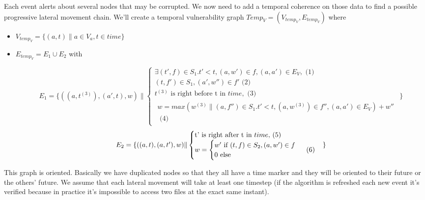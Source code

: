 \documentclass[11pt]{article}
\begin{document}
Each event alerts about several nodes that may be corrupted. We now need to add a temporal coherence on those data to find a possible progressive lateral movement chain. We'll create a temporal vulnerability graph $Temp_V=(V_{temp_V},E_{temp_V})$ where 
\begin{itemize}
\item $V_{temp_V} = \{(a,t) \|a \in V_a, t\in time\}$
\item $E_{temp_V} = E_1 \cup E_2$ with

\begin{equation*}
E_1 = \{((a,t^{(3)}),(a',t),w) \|
\begin{cases}
\exists (t',f)\in S_1.t'<t,(a,w')\in f,(a,a')\in E_V,\mbox{ (1)}\\
(t,f')\in S_1,(a',w'')\in f'\mbox{ (2)}\\
\mbox{$t^{(3)}$ is right before t in $time$},\mbox{ (3)}\\
\begin{split}
w=max(w^{(3)}\|(a,f'')\in S_1.t'<t,(a,w^{(3)})\in f'',(a,a')\in E_V)+w''\\\mbox{ (4)}
\end{split}
\end{cases}\}
\end{equation*}
\begin{equation*}
\begin{split}
\mbox{$E_2 = \{((a,t),(a,t'),w) \|$}
\begin{cases}
\mbox{t' is right after t in $time$,\mbox{ (5)}}\\
w = \begin{cases}
\mbox{$w'$ if $(t,f)\in S_2,(a,w')\in f$}\\
\mbox{0 else}
\end{cases}\mbox{ (6)}
\end{cases}\}
\end{split}
\end{equation*}
\end{itemize}

This graph is oriented. Basically we have duplicated nodes so that they all have a time marker and they will be oriented to their future or the others' future. We assume that each lateral movement will take at least one timestep (if the algorithm is refreshed each new event it's verified because in practice it's impossible to access two files at the exact same instant).
\end{document}
